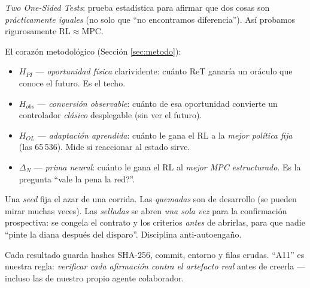 \documentclass[11pt,a4paper]{article}
\begin{document}
\begin{description}[style=unboxed,leftmargin=0pt]
\item[TOST / equivalencia.]
\emph{Two One-Sided Tests}: prueba estadística para afirmar que dos cosas son \emph{prácticamente
iguales} (no solo que ``no encontramos diferencia''). Así probamos rigurosamente RL${\approx}$MPC.

\item[Las cuatro cantidades de la escalera: $H_{PI}$, $H_{obs}$, $H_{OL}$, $\Delta_N$.]
El corazón metodológico (Sección \ref{sec:metodo}):
\begin{itemize}[nosep]
  \item $H_{PI}$ — \emph{oportunidad física} clarividente: cuánto ReT ganaría un oráculo que conoce el
        futuro. Es el techo.
  \item $H_{obs}$ — \emph{conversión observable}: cuánto de esa oportunidad convierte un controlador
        \emph{clásico} desplegable (sin ver el futuro).
  \item $H_{OL}$ — \emph{adaptación aprendida}: cuánto le gana el RL a la \emph{mejor política fija}
        (las 65\,536). Mide si reaccionar al estado sirve.
  \item $\Delta_N$ — \emph{prima neural}: cuánto le gana el RL al \emph{mejor MPC estructurado}. Es la
        pregunta ``\textquestiondown{}vale la pena la red?''.
\end{itemize}

\item[Seeds selladas vs quemadas (\emph{sealed} vs \emph{burned}).]
Una \emph{seed} fija el azar de una corrida. Las \emph{quemadas} son de desarrollo (se pueden mirar
muchas veces). Las \emph{selladas} se abren \emph{una sola vez} para la confirmación prospectiva: se
congela el contrato y los criterios \emph{antes} de abrirlas, para que nadie ``pinte la diana después
del disparo''. Disciplina anti-autoengaño.

\item[Custodia y A11.]
Cada resultado guarda hashes SHA-256, commit, entorno y filas crudas. ``A11'' es nuestra regla:
\emph{verificar cada afirmación contra el artefacto real} antes de creerla —incluso las de nuestro
propio agente colaborador.
\end{description}

\end{document}
